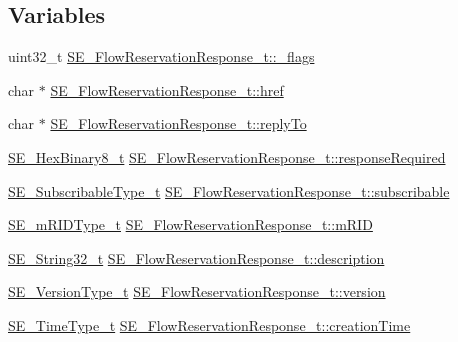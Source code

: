 \subsection*{Variables}
\begin{DoxyCompactItemize}
\item 
uint32\+\_\+t \hyperlink{group__FlowReservationResponse_ga84d53e405769d4e812dca9f816988bce}{S\+E\+\_\+\+Flow\+Reservation\+Response\+\_\+t\+::\+\_\+flags}
\item 
char $\ast$ \hyperlink{group__FlowReservationResponse_gadc31242beb269a2a28b4fca3f45b38fb}{S\+E\+\_\+\+Flow\+Reservation\+Response\+\_\+t\+::href}
\item 
char $\ast$ \hyperlink{group__FlowReservationResponse_gabfe55ba24b153e9af989100544c73a0c}{S\+E\+\_\+\+Flow\+Reservation\+Response\+\_\+t\+::reply\+To}
\item 
\hyperlink{group__HexBinary8_gaecf2dab3615fb954a693c017a61f77d6}{S\+E\+\_\+\+Hex\+Binary8\+\_\+t} \hyperlink{group__FlowReservationResponse_gab718a8c77c27f3cef17dc8815a015901}{S\+E\+\_\+\+Flow\+Reservation\+Response\+\_\+t\+::response\+Required}
\item 
\hyperlink{group__SubscribableType_ga5c41f553d369710ed34619266bf2551e}{S\+E\+\_\+\+Subscribable\+Type\+\_\+t} \hyperlink{group__FlowReservationResponse_ga94f00e1c91f5d76b177e210db546cf6b}{S\+E\+\_\+\+Flow\+Reservation\+Response\+\_\+t\+::subscribable}
\item 
\hyperlink{group__mRIDType_gac74622112f3a388a2851b2289963ba5e}{S\+E\+\_\+m\+R\+I\+D\+Type\+\_\+t} \hyperlink{group__FlowReservationResponse_ga6559f6f39d1165b71e60144040d86f3e}{S\+E\+\_\+\+Flow\+Reservation\+Response\+\_\+t\+::m\+R\+ID}
\item 
\hyperlink{group__String32_gac9f59b06b168b4d2e0d45ed41699af42}{S\+E\+\_\+\+String32\+\_\+t} \hyperlink{group__FlowReservationResponse_ga93ab9fa4728aabe9cf9de0a1ce61f9ca}{S\+E\+\_\+\+Flow\+Reservation\+Response\+\_\+t\+::description}
\item 
\hyperlink{group__VersionType_ga4b8d27838226948397ed99f67d46e2ae}{S\+E\+\_\+\+Version\+Type\+\_\+t} \hyperlink{group__FlowReservationResponse_ga4749b6c0f5dbe4bf63f7d62b2e0c698d}{S\+E\+\_\+\+Flow\+Reservation\+Response\+\_\+t\+::version}
\item 
\hyperlink{group__TimeType_ga6fba87a5b57829b4ff3f0e7638156682}{S\+E\+\_\+\+Time\+Type\+\_\+t} \hyperlink{group__FlowReservationResponse_ga79b81cc7eecfbcbe052af729a5342dd5}{S\+E\+\_\+\+Flow\+Reservation\+Response\+\_\+t\+::creation\+Time}
\item 

\end{DoxyCompactItemize}
